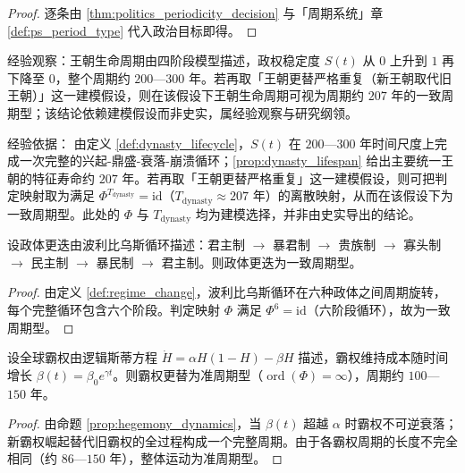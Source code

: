 \begin{proof}
逐条由 \cref{thm:politics_periodicity_decision} 与「周期系统」章 \cref{def:ps_period_type} 代入政治目标即得。
\end{proof}

\begin{remark}\label{lem:dynasty_periodic}
经验观察：王朝生命周期由四阶段模型描述，政权稳定度 $S(t)$ 从 $0$ 上升到 $1$ 再下降至 $0$，整个周期约 $200$—$300$ 年。若再取「王朝更替严格重复（新王朝取代旧王朝）」这一建模假设，则在该假设下王朝生命周期可视为周期约 $207$ 年的一致周期型；该结论依赖建模假设而非史实，属经验观察与研究纲领。

经验依据：
由定义 \ref{def:dynasty_lifecycle}，$S(t)$ 在 $200$—$300$ 年时间尺度上完成一次完整的兴起-鼎盛-衰落-崩溃循环；\cref{prop:dynasty_lifespan} 给出主要统一王朝的特征寿命约 $207$ 年。若再取「王朝更替严格重复」这一建模假设，则可把判定映射取为满足 $\Phi^{T_{\text{dynasty}}}=\mathrm{id}$（$T_{\text{dynasty}}\approx207$ 年）的离散映射，从而在该假设下为一致周期型。此处的 $\Phi$ 与 $T_{\text{dynasty}}$ 均为建模选择，并非由史实导出的结论。
\end{remark}

\begin{lemma}[政体更迭的周期判定]\label{lem:regime_periodic}
设政体更迭由波利比乌斯循环描述：君主制 $\to$ 暴君制 $\to$ 贵族制 $\to$ 寡头制 $\to$ 民主制 $\to$ 暴民制 $\to$ 君主制。则政体更迭为一致周期型。
\end{lemma}

\begin{proof}
由定义 \ref{def:regime_change}，波利比乌斯循环在六种政体之间周期旋转，每个完整循环包含六个阶段。判定映射 $\Phi$ 满足 $\Phi^6=\mathrm{id}$（六阶段循环），故为一致周期型。
\end{proof}

\begin{lemma}[帝国霸权更替的周期判定]\label{lem:hegemony_periodic}
设全球霸权由逻辑斯蒂方程 $\dot H=\alpha H(1-H)-\beta H$ 描述，霸权维持成本随时间增长 $\beta(t)=\beta_0 e^{\gamma t}$。则霸权更替为准周期型（$\operatorname{ord}(\Phi)=\infty$），周期约 $100$—$150$ 年。
\end{lemma}

\begin{proof}
由命题 \ref{prop:hegemony_dynamics}，当 $\beta(t)$ 超越 $\alpha$ 时霸权不可逆衰落；新霸权崛起替代旧霸权的全过程构成一个完整周期。由于各霸权周期的长度不完全相同（约 $86$—$150$ 年），整体运动为准周期型。
\end{proof}

